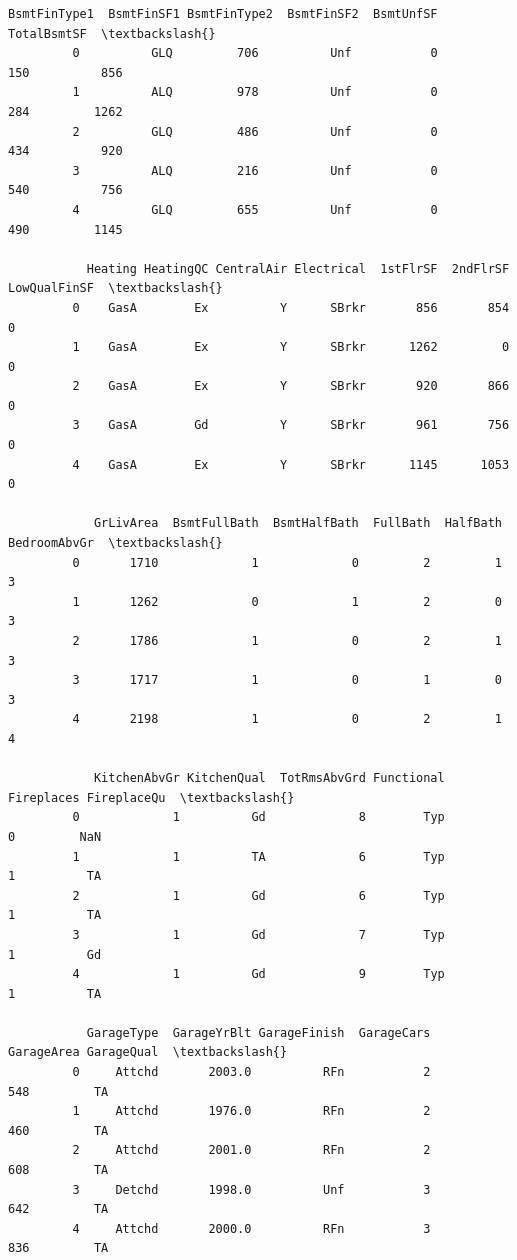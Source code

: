 \documentclass[11pt, a4paper , landscape]{article}
\begin{document}
\begin{Verbatim}[commandchars=\\\{\}]
           BsmtFinType1  BsmtFinSF1 BsmtFinType2  BsmtFinSF2  BsmtUnfSF  TotalBsmtSF  \textbackslash{}
         0          GLQ         706          Unf           0        150          856   
         1          ALQ         978          Unf           0        284         1262   
         2          GLQ         486          Unf           0        434          920   
         3          ALQ         216          Unf           0        540          756   
         4          GLQ         655          Unf           0        490         1145   
         
           Heating HeatingQC CentralAir Electrical  1stFlrSF  2ndFlrSF  LowQualFinSF  \textbackslash{}
         0    GasA        Ex          Y      SBrkr       856       854             0   
         1    GasA        Ex          Y      SBrkr      1262         0             0   
         2    GasA        Ex          Y      SBrkr       920       866             0   
         3    GasA        Gd          Y      SBrkr       961       756             0   
         4    GasA        Ex          Y      SBrkr      1145      1053             0   
         
            GrLivArea  BsmtFullBath  BsmtHalfBath  FullBath  HalfBath  BedroomAbvGr  \textbackslash{}
         0       1710             1             0         2         1             3   
         1       1262             0             1         2         0             3   
         2       1786             1             0         2         1             3   
         3       1717             1             0         1         0             3   
         4       2198             1             0         2         1             4   
         
            KitchenAbvGr KitchenQual  TotRmsAbvGrd Functional  Fireplaces FireplaceQu  \textbackslash{}
         0             1          Gd             8        Typ           0         NaN   
         1             1          TA             6        Typ           1          TA   
         2             1          Gd             6        Typ           1          TA   
         3             1          Gd             7        Typ           1          Gd   
         4             1          Gd             9        Typ           1          TA   
         
           GarageType  GarageYrBlt GarageFinish  GarageCars  GarageArea GarageQual  \textbackslash{}
         0     Attchd       2003.0          RFn           2         548         TA   
         1     Attchd       1976.0          RFn           2         460         TA   
         2     Attchd       2001.0          RFn           2         608         TA   
         3     Detchd       1998.0          Unf           3         642         TA   
         4     Attchd       2000.0          RFn           3         836         TA   
         

\end{Verbatim}
\end{document}
